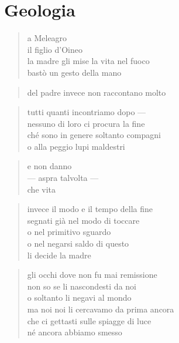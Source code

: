 \chapter{Geologia}


\begin{verse}
    a Meleagro\\
    il figlio d'Oineo\\
    la madre gli mise la vita nel fuoco\\
    bastò un gesto della mano
\end{verse}

\begin{verse}
    del padre invece non raccontano molto
\end{verse}

\clearpage


\begin{verse}
    tutti quanti incontriamo dopo —\\
    nessuno di loro ci procura la fine\\
    ché sono in genere soltanto compagni\\
    o alla peggio lupi maldestri
\end{verse}

\begin{verse}
    e non danno\\
    — aspra talvolta —\\
    che vita
\end{verse}

\begin{verse}
    invece il modo e il tempo della fine\\
    segnati già nel modo di toccare\\
    o nel primitivo sguardo\\
    o nel negarsi saldo di questo\\
    li decide la madre
\end{verse}

\clearpage


\begin{verse}
    gli occhi dove non fu mai remissione\\
    non so se li nascondesti da noi\\
    o soltanto li negavi al mondo\\
    ma noi noi li cercavamo da prima ancora\\
    che ci gettasti sulle spiagge di luce\\
    né ancora abbiamo smesso
\end{verse}

